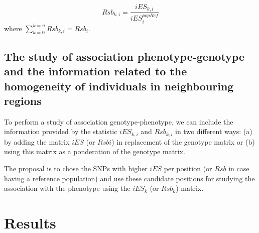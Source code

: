 \documentclass[a4paper,11pt]{article}
\begin{document}
\begin{equation}
Rsb_{k,i} = \frac{iES_{k,i}}{iES_{i}^{popRef}}
\end{equation}
where $\sum_{k=0}^{k=n}Rsb_{k,i} = Rsb_i.$

\subsection{The study of association phenotype-genotype and the information related to the homogeneity of individuals in neighbouring regions}
To perform a study of association genotype-phenotype, we can include the information provided by the statistic $iES_{k,i}$ and $Rsb_{k,i}$ in two different ways: (a) by adding the matrix $iES$ (or $Rsbi$) in replacement of the genotype matrix or (b) using this matrix as a ponderation of the genotype matrix. %



\noindent The proposal is to chose the SNPs with higher $iES$ per position (or $Rsb$ in case having a reference population) and use  these candidate positions for studying the association with the phenotype using the $iES_k$  (or $Rsb_k$) matrix.

\section{Results}
\end{document}
